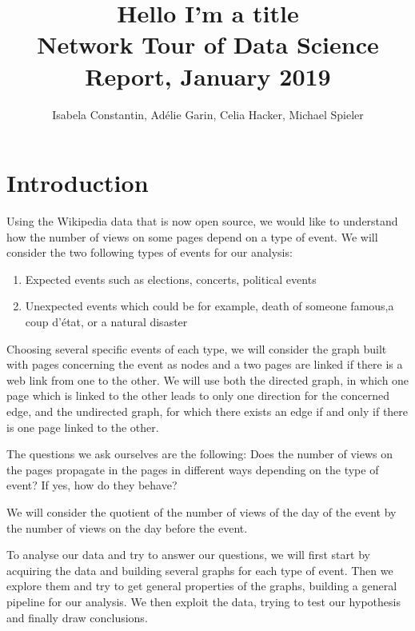 \documentclass{article}
\begin{document}
\title{Hello I'm a title\\
{\footnotesize Network Tour of Data Science Report, January 2019}
}

\author{Isabela Constantin, Ad\'elie Garin, Celia Hacker, Michael Spieler}

\maketitle

\section{Introduction}
Using the Wikipedia data that is now open source, we would like to understand how the number of views on some pages depend on a type of event. We will consider the two following types of events for our analysis:
\begin{enumerate}
\item Expected events such as elections, concerts, political events
\item Unexpected events which could be for example, death of someone famous,a coup d’état, or a natural disaster
\end{enumerate} 



Choosing several specific events of each type, we will consider the graph built with pages concerning the event as nodes and a two pages are linked if there is a web link from one to the other. We will use both the directed graph, in which one page which is linked to the other leads to only one direction for the concerned edge, and the undirected graph, for which there exists an edge if and only if there is one page linked to the other. 
\medskip

The questions we ask ourselves are the following:  Does the number of views on the pages propagate in the pages in different ways depending on the type of event? If yes, how do they behave?
\medskip

We will consider the quotient of the number of views of the day of the event by the number of views on the day before the event. 
\medskip

To analyse our data and try to answer our questions, we will first start by acquiring the data and building several graphs for each type of event.  Then we explore them and try to get general properties of the graphs, building a general pipeline for our analysis. We then exploit the data, trying to test our hypothesis and finally draw conclusions. 
\end{document}

